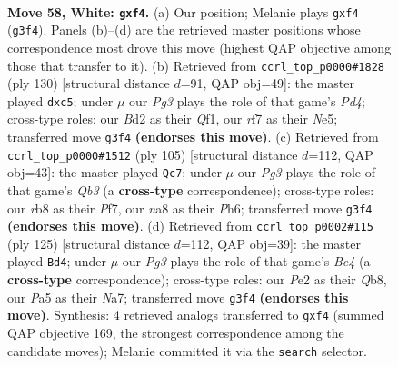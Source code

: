 \documentclass[11pt]{article}
\begin{document}
\clearpage

\begin{figure}[p]\centering
\begin{subfigure}{0.46\textwidth}\centering
\resizebox{\linewidth}{!}{%
\newchessgame
\chessboard[
  setfen={nr4k1/3qbr2/8/PNp2p1p/3p1np1/6P1/QR1BP2P/2RN2K1 w - - 0 58},
  showmover=false,
  pgfstyle=straightmove, color=movearrow, markmove={g3-f4}
]}
\caption{}
\end{subfigure}\hfill
\begin{subfigure}{0.46\textwidth}\centering
\resizebox{\linewidth}{!}{%
\newchessgame
\chessboard[
  setfen={1q1r3k/1b2r1p1/p3p1Bp/P1n1Np1P/1p1P4/1P4P1/4R1PK/5Q2 w - - 0 66},
  showmover=false,
  pgfstyle=straightmove, color=movearrow, markmove={d4-c5}
]}
\caption{}
\end{subfigure}
\\[4pt]
\begin{subfigure}{0.46\textwidth}\centering
\resizebox{\linewidth}{!}{%
\newchessgame
\chessboard[
  setfen={6k1/5pp1/1q2rn1p/pB5r/2PRb3/1P2P2P/3Q2P1/4NRK1 b - - 24 53},
  showmover=false,
  pgfstyle=straightmove, color=movearrow, markmove={b6-c7}
]}
\caption{}
\end{subfigure}\hfill
\begin{subfigure}{0.46\textwidth}\centering
\resizebox{\linewidth}{!}{%
\newchessgame
\chessboard[
  setfen={1q6/nr3b1k/3p2p1/2pPb2p/N1P1P2P/1P2Q2B/KR6/4B3 b - - 0 63},
  showmover=false,
  pgfstyle=straightmove, color=movearrow, markmove={e5-d4}
]}
\caption{}
\end{subfigure}
\caption{\textbf{Move 58, White: \texttt{gxf4}.} (a) Our position; Melanie plays \texttt{gxf4} (\texttt{g3f4}). Panels (b)--(d) are the retrieved master positions whose correspondence most drove this move (highest QAP objective among those that transfer to it). (b) Retrieved from \texttt{ccrl\_top\_p0000\#1828} (ply 130) [structural distance $d$=91, QAP obj=49]: the master played \texttt{dxc5}; under $\mu$ our \emph{Pg3} plays the role of that game's \emph{Pd4}; cross-type roles: our \emph{B}d2 as their \emph{Q}f1, our \emph{r}f7 as their \emph{N}e5; transferred move \texttt{g3f4} \textbf{(endorses this move)}. (c) Retrieved from \texttt{ccrl\_top\_p0000\#1512} (ply 105) [structural distance $d$=112, QAP obj=43]: the master played \texttt{Qc7}; under $\mu$ our \emph{Pg3} plays the role of that game's \emph{Qb3} (a \textbf{cross-type} correspondence); cross-type roles: our \emph{r}b8 as their \emph{P}f7, our \emph{n}a8 as their \emph{P}h6; transferred move \texttt{g3f4} \textbf{(endorses this move)}. (d) Retrieved from \texttt{ccrl\_top\_p0002\#115} (ply 125) [structural distance $d$=112, QAP obj=39]: the master played \texttt{Bd4}; under $\mu$ our \emph{Pg3} plays the role of that game's \emph{Be4} (a \textbf{cross-type} correspondence); cross-type roles: our \emph{P}e2 as their \emph{Q}b8, our \emph{P}a5 as their \emph{N}a7; transferred move \texttt{g3f4} \textbf{(endorses this move)}. Synthesis: 4 retrieved analogs transferred to \texttt{gxf4} (summed QAP objective 169, the strongest correspondence among the candidate moves); Melanie committed it via the \texttt{search} selector.}
\label{fig:thought-m114}
\end{figure}
\end{document}
